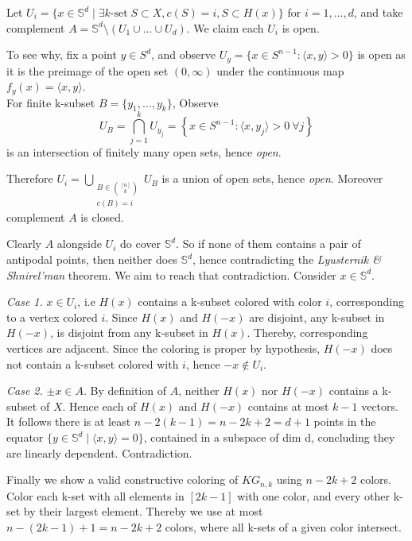 \documentclass[12pt]{extarticle}
\begin{document}
Let $U_i = \{ x \in \mathbb{S}^d \mid \exists k\text{-set} \; S \subset X, c(S) = i, S \subset H(x) \}$ for $i=1,\dots,d$, and take complement $A = \mathbb{S}^d \setminus (U_1 \cup \dots \cup U_d)$. We claim each $U_i$ is open.

To see why, fix a point $y \in S^{d}$, and observe $U_{y} = \{ x \in S^{n-1} : \langle x, y \rangle > 0 \}$ is open as it is the preimage of the open set $(0, \infty)$ under the continuous map $f_y(x) = \langle x, y \rangle$.\\

For finite k-subset $B = \{ y_1, \dots, y_k \}$, Observe
$$
U_B = \bigcap_{j=1}^k U_{y_j} = \left\{ x \in S^{n-1} : \langle x, y_j \rangle > 0 \ \forall j \right\}
$$
is an intersection of finitely many open sets, hence \textit{open}.

Therefore $U_i = \bigcup_{\substack{B \in \binom{[n]}{k} \\ c(B)=i}} U_B$ is a union of open sets, hence \textit{open}. Moreover complement $A$ is closed.

Clearly $A$ alongside $U_i$ do cover $\mathbb{S}^d$. So if none of them contains a pair of antipodal points, then neither does $\mathbb{S}^d$, hence contradicting the \textit{Lyusternik \& Shnirel'man} theorem. We aim to reach that contradiction. Consider $x \in \mathbb{S}^d$.

\textit{Case 1.} $x \in U_i$, i.e $H(x)$ contains a k-subset colored with color $i$, corresponding to a vertex colored $i$. Since $H(x)$ and $H(-x)$ are disjoint, any k-subset in $H(-x)$, is disjoint from any k-subset in $H(x)$. Thereby, corresponding vertices are adjacent. Since the coloring is proper by hypothesis, $H(-x)$ does not contain a k-subset colored with $i$, hence $-x \not\in U_i$.

\textit{Case 2.} $\pm x \in A$. By definition of $A$, neither $H(x)$ nor $H(-x)$ contains a k-subset of $X$. Hence each of $H(x)$ and $H(-x)$ contains at most $k-1$ vectors. It follows there is at least $n-2(k-1) = n-2k+2 = d+1$ points in the equator $\{ y \in \mathbb{S}^d \mid \langle x,y \rangle = 0 \}$, contained in a subspace of dim d, concluding they are linearly dependent. Contradiction.

Finally we show a valid constructive coloring of $KG_{n,k}$ using $n-2k + 2$ colors. Color each k-set with all elements in $[2k - 1]$ with one color, and every other k-set by their largest element. Thereby we use at most $n - (2k-1) + 1 = n - 2k + 2$ colors, where all k-sets of a given color intersect.
\end{document}
